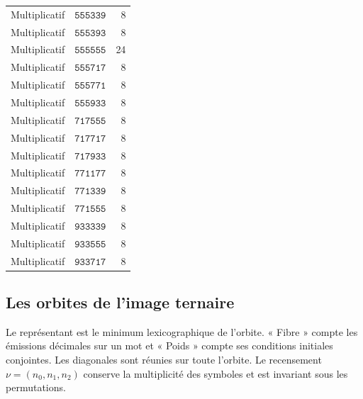 \begin{longtable}{@{}llr@{}}
Multiplicatif&\(\mathtt{555339}\)&8\\
Multiplicatif&\(\mathtt{555393}\)&8\\
Multiplicatif&\(\mathtt{555555}\)&24\\
Multiplicatif&\(\mathtt{555717}\)&8\\
Multiplicatif&\(\mathtt{555771}\)&8\\
Multiplicatif&\(\mathtt{555933}\)&8\\
Multiplicatif&\(\mathtt{717555}\)&8\\
Multiplicatif&\(\mathtt{717717}\)&8\\
Multiplicatif&\(\mathtt{717933}\)&8\\
Multiplicatif&\(\mathtt{771177}\)&8\\
Multiplicatif&\(\mathtt{771339}\)&8\\
Multiplicatif&\(\mathtt{771555}\)&8\\
Multiplicatif&\(\mathtt{933339}\)&8\\
Multiplicatif&\(\mathtt{933555}\)&8\\
Multiplicatif&\(\mathtt{933717}\)&8\\
\bottomrule
\end{longtable}



\subsection{Les orbites de l’image ternaire}
Le représentant est le minimum lexicographique de l'orbite. « Fibre »
compte les émissions décimales sur un mot et « Poids » compte ses
conditions initiales conjointes. Les diagonales sont réunies sur
toute l'orbite. Le recensement \(\nu=(n_0,n_1,n_2)\) conserve la
multiplicité des symboles et est invariant sous les permutations.

